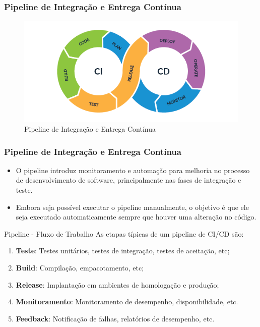 \documentclass[
	9pt, %
	t, %
]{beamer}
\begin{document}
\begin{frame}
	\frametitle{Pipeline de Integração e Entrega Contínua}
	\begin{figure}
		\centering
		\includegraphics[width=0.9\linewidth]{ci_cd_pipeline.png}
		\caption{Pipeline de Integração e Entrega Contínua}
		\label{fig:ci_cd}
	\end{figure}
\end{frame}

\begin{frame}
	\frametitle{Pipeline de Integração e Entrega Contínua}
	
	\begin{itemize}
		\item O pipeline introduz monitoramento e automação para melhoria no processo de desenvolvimento de software, principalmente nas fases de integração e teste.
		\item Embora seja possível executar o pipeline manualmente, o objetivo é que ele seja executado automaticamente sempre que houver uma alteração no código.
	\end{itemize}
	\begin{block}{Pipeline - Fluxo de Trabalho}
		As etapas típicas de um pipeline de CI/CD são:
		\bigskip

		\begin{enumerate}
			\item \textbf{Teste}: Testes unitários, testes de integração, testes de aceitação, etc;
			\item \textbf{Build}: Compilação, empacotamento, etc;
			\item \textbf{Release}: Implantação em ambientes de homologação e produção;
			\item \textbf{Monitoramento}: Monitoramento de desempenho, disponibilidade, etc.
			\item \textbf{Feedback}: Notificação de falhas, relatórios de desempenho, etc. 
		\end{enumerate}
	\end{block}
		
\end{frame}
\end{document}
